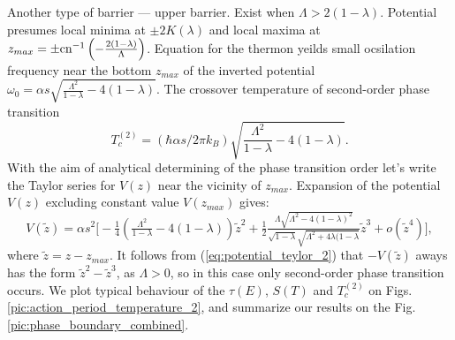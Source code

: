 \documentclass[aps, pre, preprint, groupedaddress, superscriptaddress, showkeys, showpacs] {revtex4-1}
\begin{document}
Another type of barrier --- upper barrier.
Exist when $\Lambda > 2(1 - \lambda)$.
Potential presumes local minima at $\pm 2K(\lambda)$ and local maxima at $z_{max} = \pm \textrm{cn}^{-1} \left( -\frac{2(1 - \lambda)}{\Lambda} \right)$.
Equation for the thermon yeilds small ocsilation frequency near the bottom $z_{max}$ of the inverted potential $\omega_0 = \alpha s \sqrt{\frac{\Lambda^2}{1 - \lambda} - 4(1 - \lambda)}$.
The crossover temperature of second-order phase transition
%
\begin{equation}
T_{c}^{(2)} = (\hbar \alpha s / 2 \pi k_B) \sqrt{\frac{\Lambda^2}{1 - \lambda} - 4(1 - \lambda)}.
\label{eq:second_order_2}
\end{equation}
%
With the aim of analytical determining of the phase transition order let's write the Taylor series for $V(z)$ near the vicinity of $z_{max}$.
Expansion of the potential $V(z)$ excluding constant value $V(z_{max})$ gives:
%
\begin{equation}
V(\tilde{z}) = \alpha s^2 \Big[ -\tfrac{1}{4} \left( \tfrac{\Lambda^2}{1 - \lambda} - 4(1 - \lambda) \right) \tilde{z}^2 
+ \tfrac{1}{2} \tfrac{\Lambda \sqrt{\Lambda^2 - 4(1 - \lambda)^2}}{\sqrt{1 - \lambda} \sqrt{\Lambda^2 + 4 \lambda (1 - \lambda}} \tilde{z}^3 + o(\tilde{z}^4) \Big],
\label{eq:potential_teylor_2}
\end{equation}
%
where $\tilde{z} = z - z_{max}$.
It follows from (\ref{eq:potential_teylor_2}) that $-V(\tilde{z})$ aways has the form $\tilde{z}^2 - \tilde{z}^3$, as $\Lambda > 0$, so in this case only second-order phase transition occurs.
We plot typical behaviour of the $\tau(E)$, $S(T)$ and $T_{c}^{(2)}$ on Figs. \ref{pic:action_period_temperature_2}, and summarize our results on the Fig. \ref{pic:phase_boundary_combined}.
%
\end{document}
